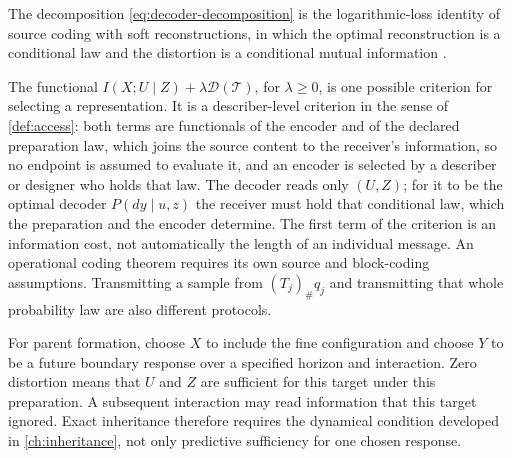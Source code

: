 The decomposition \cref{eq:decoder-decomposition} is the logarithmic-loss identity of source coding with soft reconstructions, in which the optimal reconstruction is a conditional law and the distortion is a conditional mutual information \citep{CourtadeWeissman2014}.

The functional $I(X;U\mid Z)+\lambda\mathcal D(\mathcal T)$, for $\lambda\geq0$, is one possible criterion for selecting a representation. It is a describer-level criterion in the sense of \cref{def:access}: both terms are functionals of the encoder and of the declared preparation law, which joins the source content to the receiver's information, so no endpoint is assumed to evaluate it, and an encoder is selected by a describer or designer who holds that law. The decoder reads only $(U,Z)$; for it to be the optimal decoder $P(dy\mid u,z)$ the receiver must hold that conditional law, which the preparation and the encoder determine. The first term of the criterion is an information cost, not automatically the length of an individual message. An operational coding theorem requires its own source and block-coding assumptions. Transmitting a sample from $(T_j)_\#q_j$ and transmitting that whole probability law are also different protocols.

For parent formation, choose $X$ to include the fine configuration and choose $Y$ to be a future boundary response over a specified horizon and interaction. Zero distortion means that $U$ and $Z$ are sufficient for this target under this preparation. A subsequent interaction may read information that this target ignored. Exact inheritance therefore requires the dynamical condition developed in \cref{ch:inheritance}, not only predictive sufficiency for one chosen response.
